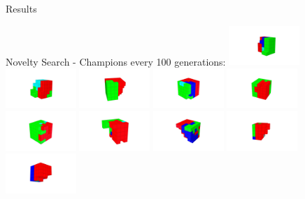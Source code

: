 \documentclass{beamer}
\begin{document}
\begin{frame}[allowframebreaks]{Results}
\newpage
\begin{minipage}{\textwidth}
\begin{block}{Novelty Search - Champions every 100 generations:}
\includegraphics[width=0.2\textwidth]{figures/Robots/n_3_g_100.jpg}
\includegraphics[width=0.2\textwidth]{figures/Robots/n_3_g_200.jpg}
\includegraphics[width=0.2\textwidth]{figures/Robots/n_3_g_300.jpg}
\includegraphics[width=0.2\textwidth]{figures/Robots/n_3_g_400.jpg}
\includegraphics[width=0.2\textwidth]{figures/Robots/n_3_g_500.jpg}\\
\includegraphics[width=0.2\textwidth]{figures/Robots/n_3_g_600.jpg}
\includegraphics[width=0.2\textwidth]{figures/Robots/n_3_g_700.jpg}
\includegraphics[width=0.2\textwidth]{figures/Robots/n_3_g_800.jpg}
\includegraphics[width=0.2\textwidth]{figures/Robots/n_3_g_900.jpg}
\includegraphics[width=0.2\textwidth]{figures/Robots/n_3_g_1000.jpg}
\end{block}


\end{minipage}
\end{frame}
\end{document}
